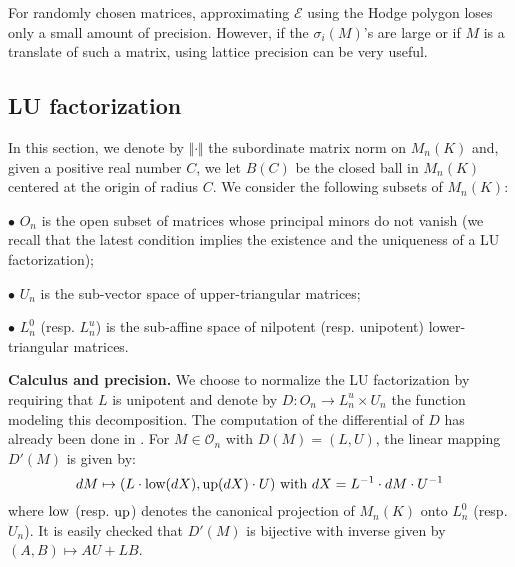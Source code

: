 \documentclass{sig-alternate-2013}
\renewcommand{\O}{\mathcal O}
\newcommand{\low}{\text{\rm low}}
\newcommand{\up}{\text{\rm up}}
\begin{document}
For randomly chosen matrices, approximating $\mathcal{E}$ 
using the Hodge polygon loses only a small amount of precision. However,
if the $\sigma_i(M)$'s are large or if $M$ is a translate of
such a matrix, using lattice precision can be very useful.

\subsection{LU factorization}

In this section, we denote by $\Vert \cdot \Vert$ the subordinate matrix norm on $M_n(K)$
and, given a positive real number $C$, we let $B(C)$ be the closed ball 
in $M_n(K)$ centered at the origin of radius $C$. We consider
the following subsets of $M_n(K)$:

\noindent $\bullet$
$O_n$ is the open subset of matrices whose principal 
minors do not vanish (we recall that the latest condition implies the
existence and the uniqueness of a LU factorization);

\noindent $\bullet$
$U_n$ is the sub-vector space of upper-triangular 
matrices;

\noindent $\bullet$
$L_n^0$ (resp. $L_n^u$) is the sub-affine space of 
nilpotent (resp. unipotent) lower-triangular matrices.

\smallskip

\noindent
{\bf Calculus and precision.}
We choose to normalize the LU factorization by requiring that $L$ is 
unipotent and denote by $D : O_n \to L_n^u \times U_n$ the function 
modeling this decomposition. The computation of the differential of $D$ 
has already been done in \cite[Appendix B]{caruso-roe-vaccon:14a}. For
$M \in \O_n$ with $D(M) = (L,U)$, the linear mapping $D'(M)$ is given 
by:
$$
dM \mapsto (L \cdot \low(dX), \up(dX) \cdot U)
\text{ with } dX = L^{-1} \cdot dM \cdot U^{-1}
$$
where $\low$ (resp. $\up$) denotes the canonical projection of $M_n(K)$ 
onto $L_n^0$ (resp. $U_n$). 
It is easily checked that $D'(M)$ is bijective with inverse given by
$(A,B) \mapsto AU+LB$.
\end{document}

